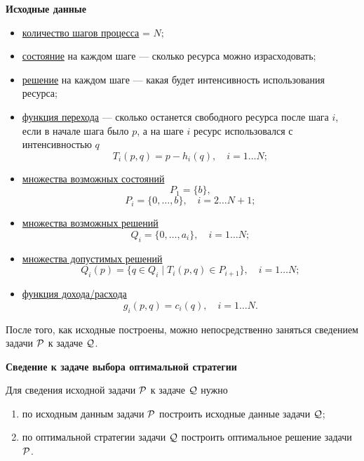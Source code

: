 \bigskip

\textbf{Исходные данные}

\begin{itemize}[nosep]
	\item \underline{количество шагов процесса} = $N$;
	
	\item \underline{состояние} на каждом шаге --- сколько ресурса можно израсходовать;
	
	\item \underline{решение} на каждом шаге --- какая будет интенсивность использования ресурса;
	
	\item \underline{функция перехода} --- сколько останется свободного ресурса после шага $i$, если в начале шага было $p$, а на шаге $i$ ресурс использовался с интенсивностью $q$
	\[
	T_i(p, q) = p - h_i(q), \quad i = 1 \dots N;
	\]
	
	\item \underline{множества возможных состояний}
	\[
	P_1 = \{b\},
	\]
	\[
	P_i = \{0, \dots, b\}, \quad i = 2 \dots N+1;
	\]
	
	\item \underline{множества возможных решений}
	\[
	Q_i = \{0, \dots, a_i\}, \quad i = 1 \dots N;
	\]
	
	\item \underline{множества допустимых решений}
	\[
	Q_i(p) = \{q \in Q_i \; \big| \; T_i(p, q) \in P_{i+1}\}, \quad i = 1 \dots N;
	\]
	
	\item \underline{функция дохода/расхода}
	\[
	g_i(p, q) = c_i(q), \quad i = 1 \dots N.
	\]
\end{itemize}

После того, как исходные построены, можно непосредственно заняться сведением задачи $\P$ к задаче $\Q$.

\bigskip

\textbf{Сведение к задаче выбора оптимальной стратегии}

Для сведения исходной задачи $\P$ к задаче $\Q$ нужно

\begin{enumerate}[nosep]
	\item по исходным данным задачи $\P$ построить исходные данные задачи $\Q$;
	
	\item по оптимальной стратегии задачи $\Q$ построить оптимальное решение задачи $\P$.
\end{enumerate}

